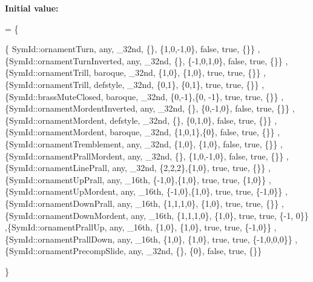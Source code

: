 {\bfseries Initial value\+:}
\begin{DoxyCode}
= \{
      
      
      \{ SymId::ornamentTurn,                any, \_32nd, \{\},    \{1,0,-1,0\},   \textcolor{keyword}{false}, \textcolor{keyword}{true}, \{\}\}
      ,\{SymId::ornamentTurnInverted,        any, \_32nd, \{\},    \{-1,0,1,0\},   \textcolor{keyword}{false}, \textcolor{keyword}{true}, \{\}\}
      ,\{SymId::ornamentTrill,           baroque, \_32nd, \{1,0\}, \{1,0\},        \textcolor{keyword}{true},  \textcolor{keyword}{true}, \{\}\}
      ,\{SymId::ornamentTrill,          defstyle, \_32nd, \{0,1\}, \{0,1\},        \textcolor{keyword}{true},  \textcolor{keyword}{true}, \{\}\}
      ,\{SymId::brassMuteClosed,         baroque, \_32nd, \{0,-1\},\{0, -1\},      \textcolor{keyword}{true},  \textcolor{keyword}{true}, \{\}\}
      ,\{SymId::ornamentMordentInverted,     any, \_32nd, \{\},    \{0,-1,0\},     \textcolor{keyword}{false}, \textcolor{keyword}{true}, \{\}\}
      ,\{SymId::ornamentMordent,        defstyle, \_32nd, \{\},    \{0,1,0\},      \textcolor{keyword}{false}, \textcolor{keyword}{true}, \{\}\} 
      ,\{SymId::ornamentMordent,         baroque, \_32nd, \{1,0,1\},\{0\},         \textcolor{keyword}{false}, \textcolor{keyword}{true}, \{\}\} 
      ,\{SymId::ornamentTremblement,         any, \_32nd, \{1,0\}, \{1,0\},        \textcolor{keyword}{false}, \textcolor{keyword}{true}, \{\}\}
      ,\{SymId::ornamentPrallMordent,        any, \_32nd, \{\},    \{1,0,-1,0\},   \textcolor{keyword}{false}, \textcolor{keyword}{true}, \{\}\}
      ,\{SymId::ornamentLinePrall,           any, \_32nd, \{2,2,2\},\{1,0\},       \textcolor{keyword}{true},  \textcolor{keyword}{true}, \{\}\}
      ,\{SymId::ornamentUpPrall,             any, \_16th, \{-1,0\},\{1,0\},        \textcolor{keyword}{true},  \textcolor{keyword}{true}, \{1,0\}\} 
      ,\{SymId::ornamentUpMordent,           any, \_16th, \{-1,0\},\{1,0\},        \textcolor{keyword}{true},  \textcolor{keyword}{true}, \{-1,0\}\} 
      ,\{SymId::ornamentDownPrall,           any, \_16th, \{1,1,1,0\}, \{1,0\},    \textcolor{keyword}{true},  \textcolor{keyword}{true}, \{\}\} 
      ,\{SymId::ornamentDownMordent,         any, \_16th, \{1,1,1,0\}, \{1,0\},    \textcolor{keyword}{true},  \textcolor{keyword}{true}, \{-1, 0\}\} 
      ,\{SymId::ornamentPrallUp,             any, \_16th, \{1,0\}, \{1,0\},        \textcolor{keyword}{true},  \textcolor{keyword}{true}, \{-1,0\}\} 
      ,\{SymId::ornamentPrallDown,           any, \_16th, \{1,0\}, \{1,0\},        \textcolor{keyword}{true},  \textcolor{keyword}{true}, \{-1,0,0,0\}\} 
      ,\{SymId::ornamentPrecompSlide,        any, \_32nd, \{\},    \{0\},          \textcolor{keyword}{false}, \textcolor{keyword}{true}, \{\}\}

      
      
      

      
      
      \}
\end{DoxyCode}


